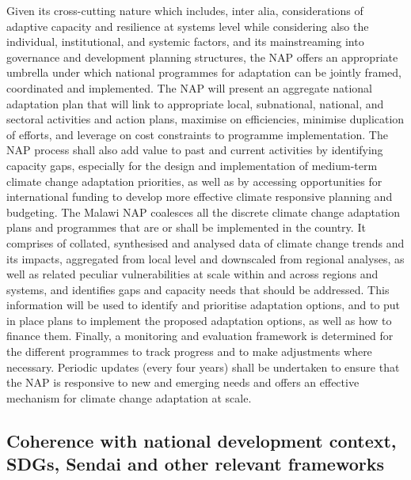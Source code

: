\documentclass[
]{book}
\begin{document}
Given its cross-cutting nature which includes, inter alia, considerations of adaptive capacity and resilience at systems level while considering also the
individual, institutional, and systemic factors, and its mainstreaming into governance and development planning structures, the NAP offers an appropriate
umbrella under which national programmes for adaptation can be jointly framed, coordinated and implemented. The NAP will present an aggregate national adaptation
plan that will link to appropriate local, subnational, national, and sectoral activities and action plans, maximise on efficiencies, minimise duplication of
efforts, and leverage on cost constraints to programme implementation. The NAP process shall also add value to past and current activities by identifying
capacity gaps, especially for the design and implementation of medium-term climate change adaptation priorities, as well as by accessing opportunities for
international funding to develop more effective climate responsive planning and budgeting. The Malawi NAP coalesces all the discrete climate change adaptation
plans and programmes that are or shall be implemented in the country. It comprises of collated, synthesised and analysed data of climate change trends and its
impacts, aggregated from local level and downscaled from regional analyses, as well as related peculiar vulnerabilities at scale within and across regions and
systems, and identifies gaps and capacity needs that should be addressed. This information will be used to identify and prioritise adaptation options, and to put
in place plans to implement the proposed adaptation options, as well as how to finance them. Finally, a monitoring and evaluation framework is determined for the
different programmes to track progress and to make adjustments where necessary. Periodic updates (every four years) shall be undertaken to ensure that the NAP is
responsive to new and emerging needs and offers an effective mechanism for climate change adaptation at scale.

\hypertarget{coherence-with-national-development-context-sdgs-sendai-and-other-relevant-frameworks}{%
\subsection{Coherence with national development context, SDGs, Sendai and other relevant frameworks}\label{coherence-with-national-development-context-sdgs-sendai-and-other-relevant-frameworks}}
\end{document}
